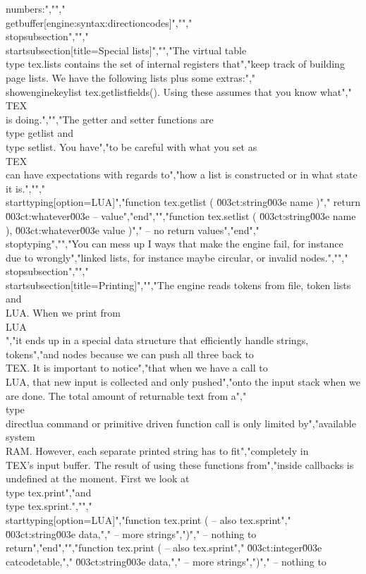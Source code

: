 numbers:","","\\getbuffer[engine:syntax:directioncodes]","","\\stopsubsection","","\\startsubsection[title={Special lists}]","","The virtual table \\type {tex.lists} contains the set of internal registers that","keep track of building page lists. We have the following lists plus some extras:","\\showenginekeylist {tex.getlistfields()}. Using these assumes that you know what","\\TEX\\ is doing.","","The getter and setter functions are \\type {getlist} and \\type {setlist}. You have","to be careful with what you set as \\TEX\\ can have expectations with regards to","how a list is constructed or in what state it is.","","\\starttyping[option=LUA]","function tex.getlist ( \u003ct:string\u003e name )","    return \u003ct:whatever\u003e -- value","end","","function tex.setlist ( \u003ct:string\u003e name ), \u003ct:whatever\u003e value )","    -- no return values","end","\\stoptyping","","You can mess up I ways that make the engine fail, for instance due to wrongly","linked lists, for instance maybe circular, or invalid nodes.","","\\stopsubsection","","\\startsubsection[title=Printing]","","The engine reads tokens from file, token lists and \\LUA. When we print from \\LUA\\","it ends up in a special data structure that efficiently handle strings, tokens","and nodes because we can push all three back to \\TEX. It is important to notice","that when we have a call to \\LUA, that new input is collected and only pushed","onto the input stack when we are done. The total amount of returnable text from a","\\type {\\directlua} command or primitive driven function call is only limited by","available system \\RAM. However, each separate printed string has to fit","completely in \\TEX's input buffer. The result of using these functions from","inside callbacks is undefined at the moment. First we look at \\type {tex.print}","and \\type {tex.sprint}.","","\\starttyping[option=LUA]","function tex.print ( -- also tex.sprint","    \u003ct:string\u003e data,","    -- more strings",")","    -- nothing to return","end","","function tex.print ( -- also tex.sprint","    \u003ct:integer\u003e catcodetable,","    \u003ct:string\u003e  data,","    -- more strings",")","    -- nothing to 